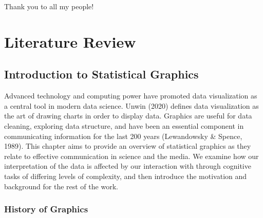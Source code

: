 \documentclass[print]{nuthesis}
\begin{document}
\begin{acknowledgments}
Thank you to all my people!
\end{acknowledgments}


\tableofcontents

\listoffigures
\listoftables

\mainmatter


\hypertarget{literature-review}{%
\chapter{Literature Review}\label{literature-review}}

\hypertarget{introduction-to-statistical-graphics}{%
\section{Introduction to Statistical Graphics}\label{introduction-to-statistical-graphics}}


Advanced technology and computing power have promoted data visualization as a central tool in modern data science. Unwin (2020) defines data visualization as the art of drawing charts in order to display data.
Graphics are useful for data cleaning, exploring data structure, and have been an essential component in communicating information for the last 200 years (Lewandowsky \& Spence, 1989).
This chapter aims to provide an overview of statistical graphics as they relate to effective communication in science and the media.
We examine how our interpretation of the data is affected by our interaction with  through cognitive tasks of differing levels of complexity, and then introduce the motivation and background for the rest of the work.

\hypertarget{history-of-graphics}{%
\subsection{History of Graphics}\label{history-of-graphics}}
\end{document}
